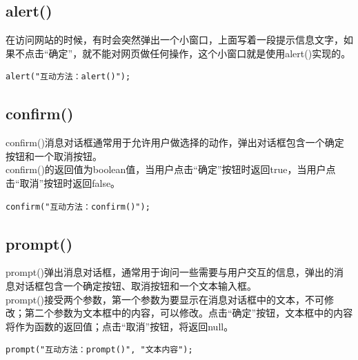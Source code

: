 \vspace{0.5cm}

\subsection{alert()}

在访问网站的时候，有时会突然弹出一个小窗口，上面写着一段提示信息文字，如果不点击“确定”，就不能对网页做任何操作，这个小窗口就是使用alert()实现的。\\

\begin{lstlisting}[style=htmlcssjs]
alert("互动方法：alert()");
\end{lstlisting}

\vspace{0.5cm}

\subsection{confirm()}

confirm()消息对话框通常用于允许用户做选择的动作，弹出对话框包含一个确定按钮和一个取消按钮。\\

confirm()的返回值为boolean值，当用户点击“确定”按钮时返回true，当用户点击“取消”按钮时返回false。\\

\begin{lstlisting}[style=htmlcssjs]
confirm("互动方法：confirm()");
\end{lstlisting}

\vspace{0.5cm}

\subsection{prompt()}

prompt()弹出消息对话框，通常用于询问一些需要与用户交互的信息，弹出的消息对话框包含一个确定按钮、取消按钮和一个文本输入框。\\

prompt()接受两个参数，第一个参数为要显示在消息对话框中的文本，不可修改；第二个参数为文本框中的内容，可以修改。点击“确定”按钮，文本框中的内容将作为函数的返回值；点击“取消”按钮，将返回null。\\

\begin{lstlisting}[style=htmlcssjs]
prompt("互动方法：prompt()", "文本内容");
\end{lstlisting}

